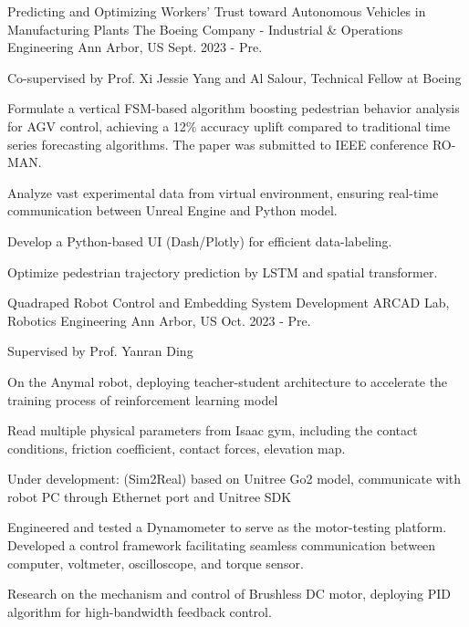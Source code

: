 

\begin{cventries}
  \begin{cventry}
    {Predicting and Optimizing Workers’ Trust toward Autonomous Vehicles in Manufacturing Plants}
    {The Boeing Company - Industrial \& Operations Engineering}
    {Ann Arbor, US}
    {Sept. 2023 - Pre.}
    {
      \begin{cvitems}
      \item {Co-supervised by Prof. Xi Jessie Yang and Al Salour, Technical Fellow at Boeing}
      \item {Formulate a vertical FSM-based algorithm boosting pedestrian behavior analysis for AGV control, achieving a 12\% accuracy uplift compared to traditional time series forecasting algorithms.
      The paper was submitted to IEEE conference RO-MAN. }
      \item {Analyze vast experimental data from virtual environment, ensuring real-time communication between Unreal Engine and Python model.}
      \item {Develop a Python-based UI (Dash/Plotly) for efficient data-labeling.}
      \item {Optimize pedestrian trajectory prediction by LSTM and spatial transformer.}
    \end{cvitems}
    }
  
  \end{cventry}

  \begin{cventry}
    {Quadraped Robot Control and Embedding System Development}
    {ARCAD Lab, Robotics Engineering}
    {Ann Arbor, US}
    {Oct. 2023 - Pre.}
    {
      \begin{cvitems}
        \item {Supervised by Prof. Yanran Ding}
        \item {On the Anymal robot, deploying teacher-student architecture to accelerate the training process of reinforcement learning model}
        \item {Read multiple physical parameters from Isaac gym, including the  contact conditions, friction coefficient, contact forces, elevation map.}
        \item {Under development: (Sim2Real) based on Unitree Go2 model, communicate with robot PC through Ethernet port and Unitree SDK}
        \item {Engineered and tested a Dynamometer to serve as the motor-testing platform. Developed a control framework facilitating seamless communication between computer, voltmeter, oscilloscope, and torque sensor.}
        \item {Research on the mechanism and control of Brushless DC motor, deploying PID algorithm for high-bandwidth feedback control.}
      \end{cvitems}
    }
  

\end{cventry}
\end{cventries}
